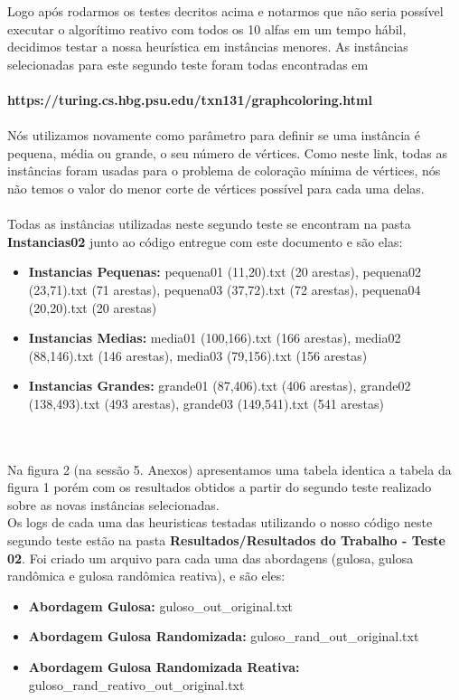 \documentclass[a4paper, 12pt]{article}
\begin{document}
\ident Logo após rodarmos os testes decritos acima e notarmos que não seria possível executar o algorítimo reativo com todos os 10 alfas em um tempo hábil, decidimos testar a nossa heurística em instâncias menores. As instâncias selecionadas para este segundo teste foram todas encontradas em \\ \\ \textbf{https://turing.cs.hbg.psu.edu/txn131/graphcoloring.html} \\ \\Nós utilizamos novamente como parâmetro para definir se uma instância é pequena, média ou grande, o seu número de vértices. Como neste link, todas as instâncias foram usadas para o problema de coloração mínima de vértices, nós não temos o valor do menor corte de vértices possível para cada uma delas. 
\\ \\ \indent Todas as instâncias utilizadas neste segundo teste se encontram na pasta \textbf{Instancias02} junto ao código entregue com este documento e são elas:

\begin{itemize}
  \item \textbf{Instancias Pequenas:} pequena01 (11,20).txt (20 arestas), pequena02 (23,71).txt (71 arestas), pequena03 (37,72).txt (72 arestas), pequena04 (20,20).txt (20 arestas)
  \item \textbf{Instancias Medias:} media01 (100,166).txt (166 arestas), media02 (88,146).txt (146 arestas), media03 (79,156).txt (156 arestas)
  \item \textbf{Instancias Grandes:} grande01 (87,406).txt (406 arestas), grande02 (138,493).txt (493 arestas), grande03 (149,541).txt (541 arestas)
\end{itemize}

\\ \\ \indent Na figura 2 (na sessão 5. Anexos) apresentamos uma tabela identica a tabela da figura 1 porém com os resultados obtidos a partir do segundo teste realizado sobre as novas instâncias selecionadas. \\

\indent Os logs de cada uma das heuristicas testadas utilizando o nosso código neste segundo teste estão na pasta \textbf{Resultados/Resultados do Trabalho - Teste 02}. Foi criado um arquivo para cada uma das abordagens (gulosa, gulosa randômica e gulosa randômica reativa), e são eles:
\begin{itemize}
  \item \textbf{Abordagem Gulosa:} guloso\_out\_original.txt
  \item \textbf{Abordagem Gulosa Randomizada:} guloso\_rand\_out\_original.txt
  \item \textbf{Abordagem Gulosa Randomizada Reativa:} guloso\_rand\_reativo\_out\_original.txt
\end{itemize}
\end{document}
